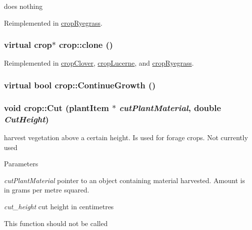 does nothing 

Reimplemented in \hyperlink{classcrop_ryegrass_a8c524dccd76c81476124974e3e486a33}{cropRyegrass}.\hypertarget{classcrop_a59eff636f3b438badd4b06811c1fc595}{
\subsubsection[{clone}]{\setlength{\rightskip}{0pt plus 5cm}virtual {\bf crop}$\ast$ crop::clone ()}}
\label{classcrop_a59eff636f3b438badd4b06811c1fc595}


Reimplemented in \hyperlink{classcrop_clover_afe134102e033bd1326eb955327b4d902}{cropClover}, \hyperlink{classcrop_lucerne_a5060448bb250b985ad156fb25b368daa}{cropLucerne}, and \hyperlink{classcrop_ryegrass_af7eb9cc81f755e89fc1486cc242b8b84}{cropRyegrass}.\hypertarget{classcrop_a1fc1c31116ee5b1254d4893e83633f21}{
\subsubsection[{ContinueGrowth}]{\setlength{\rightskip}{0pt plus 5cm}virtual bool crop::ContinueGrowth ()}}
\label{classcrop_a1fc1c31116ee5b1254d4893e83633f21}
\hypertarget{classcrop_a5b2a6a3522c64790e295055ff164dc10}{
\subsubsection[{Cut}]{\setlength{\rightskip}{0pt plus 5cm}void crop::Cut ({\bf plantItem} $\ast$ {\em cutPlantMaterial}, \/  double {\em CutHeight})}}
\label{classcrop_a5b2a6a3522c64790e295055ff164dc10}


harvest vegetation above a certain height. Is used for forage crops. Not currently used 
\begin{DoxyParams}{Parameters}
\item[{\em cutPlantMaterial}]pointer to an object containing material harvested. Amount is in grams per metre squared. \item[{\em cut\_\-height}]cut height in centimetres\end{DoxyParams}
This function should not be called 

